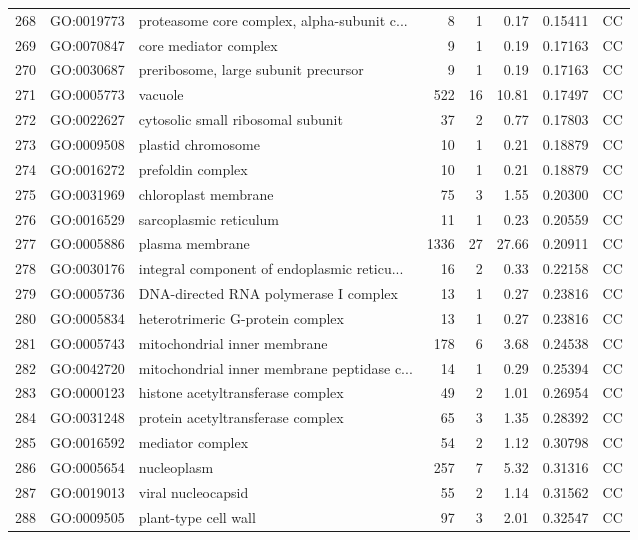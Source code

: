 \documentclass[12pt,oneside,a4paper]{article}
\begin{document}
\begin{longtable}{rllrrrll}
  268 & GO:0019773 & proteasome core complex, alpha-subunit c... &   8 &   1 & 0.17 & 0.15411 & CC \\ 
  269 & GO:0070847 & core mediator complex &   9 &   1 & 0.19 & 0.17163 & CC \\ 
  270 & GO:0030687 & preribosome, large subunit precursor &   9 &   1 & 0.19 & 0.17163 & CC \\ 
  271 & GO:0005773 & vacuole & 522 &  16 & 10.81 & 0.17497 & CC \\ 
  272 & GO:0022627 & cytosolic small ribosomal subunit &  37 &   2 & 0.77 & 0.17803 & CC \\ 
  273 & GO:0009508 & plastid chromosome &  10 &   1 & 0.21 & 0.18879 & CC \\ 
  274 & GO:0016272 & prefoldin complex &  10 &   1 & 0.21 & 0.18879 & CC \\ 
  275 & GO:0031969 & chloroplast membrane &  75 &   3 & 1.55 & 0.20300 & CC \\ 
  276 & GO:0016529 & sarcoplasmic reticulum &  11 &   1 & 0.23 & 0.20559 & CC \\ 
  277 & GO:0005886 & plasma membrane & 1336 &  27 & 27.66 & 0.20911 & CC \\ 
  278 & GO:0030176 & integral component of endoplasmic reticu... &  16 &   2 & 0.33 & 0.22158 & CC \\ 
  279 & GO:0005736 & DNA-directed RNA polymerase I complex &  13 &   1 & 0.27 & 0.23816 & CC \\ 
  280 & GO:0005834 & heterotrimeric G-protein complex &  13 &   1 & 0.27 & 0.23816 & CC \\ 
  281 & GO:0005743 & mitochondrial inner membrane & 178 &   6 & 3.68 & 0.24538 & CC \\ 
  282 & GO:0042720 & mitochondrial inner membrane peptidase c... &  14 &   1 & 0.29 & 0.25394 & CC \\ 
  283 & GO:0000123 & histone acetyltransferase complex &  49 &   2 & 1.01 & 0.26954 & CC \\ 
  284 & GO:0031248 & protein acetyltransferase complex &  65 &   3 & 1.35 & 0.28392 & CC \\ 
  285 & GO:0016592 & mediator complex &  54 &   2 & 1.12 & 0.30798 & CC \\ 
  286 & GO:0005654 & nucleoplasm & 257 &   7 & 5.32 & 0.31316 & CC \\ 
  287 & GO:0019013 & viral nucleocapsid &  55 &   2 & 1.14 & 0.31562 & CC \\ 
  288 & GO:0009505 & plant-type cell wall &  97 &   3 & 2.01 & 0.32547 & CC \\ 

\end{longtable}
\end{document}
